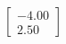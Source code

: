 \documentclass[preview]{standalone}
\begin{document}
\begin{align*}
\begin{bmatrix} -4.00 \\ 2.50 \end{bmatrix}
\end{align*}
\end{document}

